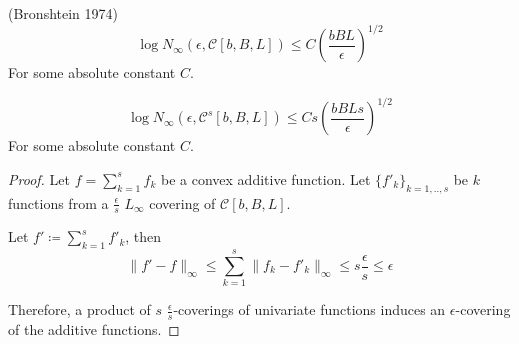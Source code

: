 \begin{lemma} (Bronshtein 1974)
\[
\log N_\infty (\epsilon, \mathcal{C}[b,B,L]) \leq C\left( \frac{bBL}{\epsilon} \right)^{1/2}
\]
For some absolute constant $C$.
\end{lemma}

\begin{lemma}
\[
\log N_\infty( \epsilon, \mathcal{C}^s[b,B,L])  \leq C s \left(\frac{bBLs}{\epsilon}\right)^{1/2}
\]
For some absolute constant $C$.
\end{lemma}

\begin{proof}
Let $f = \sum_{k=1}^s f_k$ be a convex additive function. Let $\{ f'_k \}_{k=1,..,s}$ be $k$ functions from a $\frac{\epsilon}{s}$ $L_\infty$ covering of $\mathcal{C}[b,B,L]$. 

Let $f' \coloneqq \sum_{k=1}^s f'_k$, then 
\[
\| f' - f \|_{\infty} \leq \sum_{k=1}^s \| f_k - f'_k \|_\infty \leq s \frac{\epsilon}{s} \leq \epsilon
\]

Therefore, a product of $s$ $\frac{\epsilon}{s}$-coverings of univariate functions induces an $\epsilon$-covering of the additive functions.
\end{proof}




 

